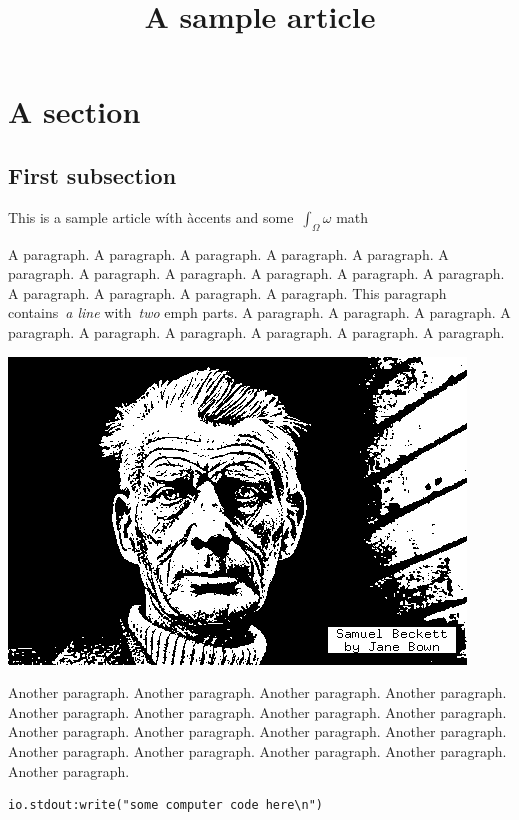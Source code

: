 \title{A sample article}

\section{A section}

\subsection{First subsection}

This is a sample article wíth àccents and some~$\int_\Omega\omega$ math


A paragraph.  A paragraph.  A paragraph.  A paragraph.  A
paragraph.  A paragraph.  A paragraph.  A paragraph.  A
paragraph.  A paragraph.  A paragraph.  A paragraph.  A
paragraph.  A paragraph.  A paragraph.
This paragraph contains~\emph{a line} with~\emph{two} emph parts.
A paragraph.  A paragraph.  A paragraph.  A paragraph.  A
paragraph.  A paragraph.  A paragraph.  A paragraph.  A
paragraph.

\includegraphics{i/binbeck.png}

Another paragraph.  Another paragraph.  Another paragraph.
Another paragraph.  Another paragraph.  Another paragraph.
Another paragraph.  Another paragraph.  Another paragraph.
Another paragraph.  Another paragraph.  Another paragraph.
Another paragraph.  Another paragraph.  Another paragraph.
Another paragraph.  Another paragraph.

\begin{verbatim}
io.stdout:write("some computer code here\n")
\end{verbatim}

